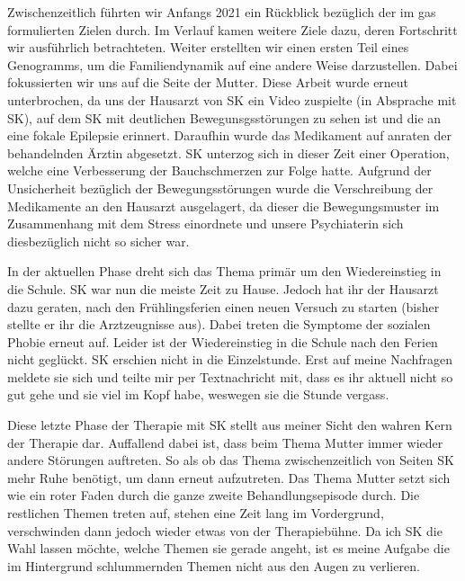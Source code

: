 Zwischenzeitlich führten wir Anfangs 2021 ein Rückblick bezüglich der im \ac{gas} formulierten Zielen durch. Im Verlauf kamen weitere Ziele dazu, deren Fortschritt wir ausführlich betrachteten. Weiter erstellten wir einen ersten Teil eines Genogramms, um die Familiendynamik auf eine andere Weise darzustellen. Dabei fokussierten wir uns auf die Seite der Mutter. Diese Arbeit wurde erneut unterbrochen, da uns der Hausarzt von SK ein Video zuspielte (in Absprache mit SK), auf dem SK mit deutlichen Bewegunsgsstörungen zu sehen ist und die an eine fokale Epilepsie erinnert. Daraufhin wurde das Medikament auf anraten der behandelnden Ärztin abgesetzt. SK unterzog sich in dieser Zeit einer Operation, welche eine Verbesserung der Bauchschmerzen zur Folge hatte. Aufgrund der Unsicherheit bezüglich der Bewegungsstörungen wurde die Verschreibung der Medikamente an den Hausarzt ausgelagert, da dieser die Bewegungsmuster im Zusammenhang mit dem Stress einordnete und unsere Psychiaterin sich diesbezüglich nicht so sicher war.

In der aktuellen Phase dreht sich das Thema primär um den Wiedereinstieg in die Schule. SK war nun die meiste Zeit zu Hause. Jedoch hat ihr der Hausarzt dazu geraten, nach den Frühlingsferien einen neuen Versuch zu starten (bisher stellte er ihr die Arztzeugnisse aus). Dabei treten die Symptome der sozialen Phobie erneut auf. Leider ist der Wiedereinstieg in die Schule nach den Ferien nicht geglückt. SK erschien nicht in die Einzelstunde. Erst auf meine Nachfragen meldete sie sich und teilte mir per Textnachricht mit, dass es ihr aktuell nicht so gut gehe und sie viel im Kopf habe, weswegen sie die Stunde vergass. 

Diese letzte Phase der Therapie mit SK stellt aus meiner Sicht den wahren Kern der Therapie dar. Auffallend dabei ist, dass beim Thema Mutter immer wieder andere Störungen auftreten. So als ob das Thema zwischenzeitlich von Seiten SK mehr Ruhe benötigt, um dann erneut aufzutreten. Das Thema Mutter setzt sich wie ein roter Faden durch die ganze zweite Behandlungsepisode durch. Die restlichen Themen treten auf, stehen eine Zeit lang im Vordergrund, verschwinden dann jedoch wieder etwas von der Therapiebühne. Da ich SK die Wahl lassen möchte, welche Themen sie gerade angeht, ist es meine Aufgabe die im Hintergrund schlummernden Themen nicht aus den Augen zu verlieren.


